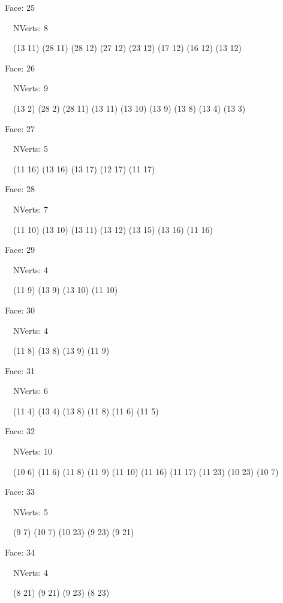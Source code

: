 \documentclass{article}
\begin{document}
{\footnotesize 

Face: 25

\   \    NVerts: 8

 \   \   (13 11) (28 11) (28 12) (27 12) (23 12) (17 12) (16 12) (13 12)}

{\footnotesize 

Face: 26

\   \    NVerts: 9

 \   \   (13 2) (28 2) (28 11) (13 11) (13 10) (13 9) (13 8) (13 4) (13 3)}

{\footnotesize 

Face: 27

\   \    NVerts: 5

 \   \   (11 16) (13 16) (13 17) (12 17) (11 17)}

{\footnotesize 

Face: 28

\   \    NVerts: 7

 \   \   (11 10) (13 10) (13 11) (13 12) (13 15) (13 16) (11 16)}

{\footnotesize 

Face: 29

\   \    NVerts: 4

 \   \   (11 9) (13 9) (13 10) (11 10)}

{\footnotesize 

Face: 30

\   \    NVerts: 4

 \   \   (11 8) (13 8) (13 9) (11 9)}

{\footnotesize 

Face: 31

\   \    NVerts: 6

 \   \   (11 4) (13 4) (13 8) (11 8) (11 6) (11 5)}

{\footnotesize 

Face: 32

\   \    NVerts: 10

 \   \   (10 6) (11 6) (11 8) (11 9) (11 10) (11 16) (11 17) (11 23) (10 23) (10 7)}

{\footnotesize 

Face: 33

\   \    NVerts: 5

 \   \   (9 7) (10 7) (10 23) (9 23) (9 21)}

{\footnotesize 

Face: 34

\   \    NVerts: 4

 \   \   (8 21) (9 21) (9 23) (8 23)}
\end{document}
